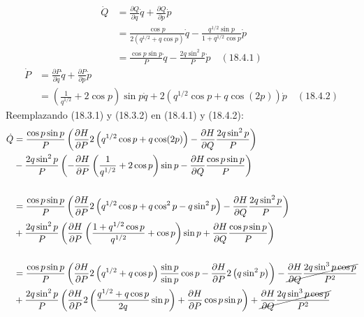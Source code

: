 \documentclass[a4paper]{article}
\begin{document}
\begin{answer}[Punto 4]
\begin{itemize}
            \begin{align*}
                \dot Q &= \frac{\partial Q}{\partial q} \dot q + \frac{\partial Q}{\partial p} \dot p\\
                &= \frac{\cos p}{2(q^{1/2}  + q \cos p)} \dot q - \frac{q^{1/2} \sin p}{1 + q^{1/2} \cos p} \dot p\\
                &= \frac{\cos p \sin p}{P} \dot q - \frac{2q \sin^2 p}{P} \dot p \quad (18.4.1)
            \end{align*}
            \begin{align*}
                \dot P &= \frac{\partial P}{\partial q} \dot q + \frac{\partial P}{\partial p} \dot p\\
                &= \left(\frac1{q^{1/2}} + 2\cos p\right)\sin p \dot q + 2 \left( q^{1/2} \cos p + q \cos (2p) \right) \dot p \quad (18.4.2) 
            \end{align*}
            Reemplazando (18.3.1) y (18.3.2) en (18.4.1) y (18.4.2):
            \begin{align*}
                \dot Q &= \frac{\cos p \sin p}{P} \left( \frac{\partial H}{\partial P} 2  \left( q^{1/2} \cos p + q \cos (2p) \right) - \frac{\partial H}{\partial Q} \frac{2q \sin^2 p}{P} \right)\\
                &- \frac{2q \sin^2 p}{P} \left( -\frac{\partial H}{\partial P} \left(\frac1{q^{1/2}} + 2\cos p\right)\sin p - \frac{\partial H}{\partial Q} \frac{\cos p \sin p}{P} \right)\\\\
                &= \frac{\cos p \sin p}{P} \left( \frac{\partial H}{\partial P} 2 \left( q^{1/2} \cos p + q \cos^2 p - q \sin^2 p \right) - \frac{\partial H}{\partial Q} \frac{2q \sin^2 p}{P} \right)\\
                &+ \frac{2q \sin^2 p}{P} \left(\frac{\partial H}{\partial P} \left(\frac{1 + q^{1/2}\cos p}{q^{1/2}} + \cos p\right)\sin p + \frac{\partial H}{\partial Q} \frac{\cos p \sin p}{P} \right)\\\\
                &= \frac{\cos p \sin p}{P} \left( \frac{\partial H}{\partial P} 2 \left( q^{1/2}  + q \cos p\right)\frac{\sin p}{\sin p}\cos p - \frac{\partial H}{\partial P} 2\left( q \sin^2 p \right)\right) - \cancel{\frac{\partial H}{\partial Q} \frac{2q \sin^3 p\cos p}{P^2}} \\
                &+ \frac{2q \sin^2 p}{P} \left(\frac{\partial H}{\partial P} 2\left(\frac{q^{1/2} + q\cos p}{2q} \sin p \right) + \frac{\partial H}{\partial P} \cos p\sin p\right) +\cancel{\frac{\partial H}{\partial Q} \frac{2q \sin^3 p\cos p}{P^2}} \\

\end{align*}
\end{itemize}
\end{answer}
\end{document}
